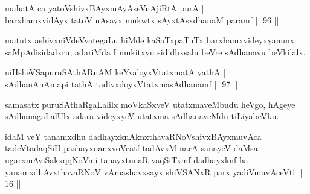 \begin{shl}
mahatA ca yatoV\s shivxBAyxmAyAseVnAjiRtA purA |\\
barxhamxvidAyx tatoV nAsayx mukwtx sAyxtAsxdhanaM paramf \hfill || 96 ||
\end{shl}

\begin{artha}
matutx ashivxniVdeVvategaLu hiMde kaSaTxpaTuTx barxhamxvideyxyanunx saMpAdisidadxru, adariMda I mukitxyu sididhxsalu beVre sAdhanavu beVkilalx.
\end{artha}

\begin{shl}
niHsheVSapuruSAthARnAM keYvaloyxVtatxmatA yathA |\\
sAdhanAnAmapi tathA tadivxdoyxVtatxmasAdhanamf \hfill || 97 ||
\end{shl}

\begin{artha}
samasatx puruSAthaRgaLalilx moVkaSxveV utatxmaveMbudu heVgo, hAgeye sAdhanagaLalUlx adara videyxyeV utatxma sAdhanaveMdu tiLiyabeVku.
\end{artha}

\newpage


\begin{kandikeshl}
idaM veY tanamxdhu dadhayxknAknxthavaRNoV\s shivxBAyxmuvAca tadeVtadaqSiH pashayxnanxvoVcatf tadAvxM narA sanayeV daMsa ugarxmAviSakxqqNoVmi tanayxtunaR vaqSiTxmf dadhayxknf ha yanamxdhAvxthavaRNoV vAmashavxsayx shiVSANxR parx yadiVmuvAceVti || 16 ||
\end{kandikeshl}


